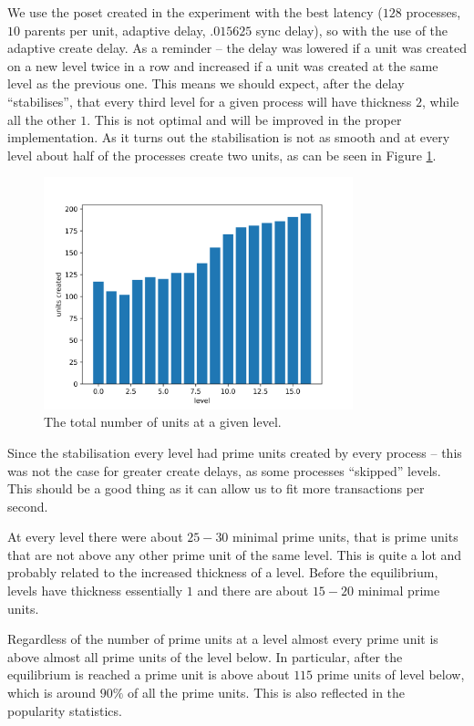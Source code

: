\documentclass[a4paper,10pt]{article}
\begin{document}
		We use the poset created in the experiment with the best latency ($128$ processes, $10$ parents per unit, adaptive delay, $.015625$ sync delay), so with the use of the adaptive create delay.
		As a reminder -- the delay was lowered if a unit was created on a new level twice in a row and increased if a unit was created at the same level as the previous one.
		This means we should expect, after the delay ``stabilises'', that every third level for a given process will have thickness $2$, while all the other $1$.
		This is not optimal and will be improved in the proper implementation.
		As it turns out the stabilisation is not as smooth and at every level about half of the processes create two units, as can be seen in Figure \ref{fig:levels}.
		\begin{figure}[h]
			\centering
			\includegraphics[width=0.8\textwidth]{bar_plots/levels.png}
			\caption{The total number of units at a given level.}
			\label{fig:levels}
		\end{figure}
		Since the stabilisation every level had prime units created by every process -- this was not the case for greater create delays, as some processes ``skipped'' levels.
		This should be a good thing as it can allow us to fit more transactions per second.

		At every level there were about $25-30$ minimal prime units, that is prime units that are not above any other prime unit of the same level.
		This is quite a lot and probably related to the increased thickness of a level.
		Before the equilibrium, levels have thickness essentially $1$ and there are about $15-20$ minimal prime units.

		Regardless of the number of prime units at a level almost every prime unit is above almost all prime units of the level below.
		In particular, after the equilibrium is reached a prime unit is above about $115$ prime units of level below, which is around $90\%$ of all the prime units.
		This is also reflected in the popularity statistics.
\end{document}
